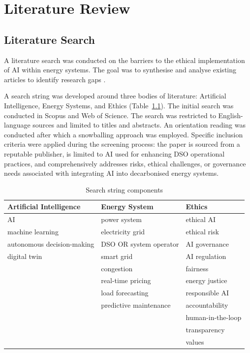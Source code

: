 \chapter{Literature Review}
\label{ch:literature}

\section{Literature Search}
\label{sec:literaturesearch}

A literature search was conducted on the barriers to the ethical implementation of AI within energy systems. The goal was to synthesise and analyse existing articles to identify research gaps \autocite{Wee2016}.

A search string was developed around three bodies of literature: Artificial Intelligence, Energy Systems, and Ethics (Table~\ref{tab:searchstring}). The initial search was conducted in Scopus and Web of Science. The search was restricted to English-language sources and limited to titles and abstracts. An orientation reading was conducted after which a snowballing approach was employed. Specific inclusion criteria were applied during the screening process: the paper is sourced from a reputable publisher, is limited to AI used for enhancing DSO operational practices, and comprehensively addresses risks, ethical challenges, or governance needs associated with integrating AI into decarbonised energy systems.

\begin{table}[h]
\centering
\caption{Search string components}
\label{tab:searchstring}
\begin{tabular}{lll}
\hline
\textbf{Artificial Intelligence} & \textbf{Energy System} & \textbf{Ethics} \\
\hline
AI & power system & ethical AI \\
machine learning & electricity grid & ethical risk \\
autonomous decision-making & DSO OR system operator & AI governance \\
digital twin & smart grid & AI regulation \\
 & congestion & fairness \\
 & real-time pricing & energy justice \\
 & load forecasting & responsible AI \\
 & predictive maintenance & accountability \\
 & & human-in-the-loop \\
 & & transparency \\
 & & values \\
\hline
\end{tabular}
\end{table}

